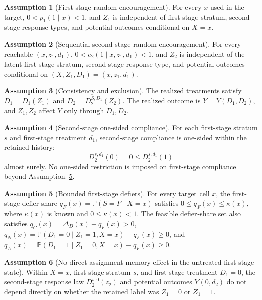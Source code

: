 \documentclass[11pt]{article}
\renewcommand{\Pr}{\mathbb{P}}
\theoremstyle{definition}
\newtheorem{assumption}{Assumption}
\theoremstyle{plain}
\theoremstyle{remark}
\begin{document}
\begin{assumption}[First-stage random encouragement]\label{ass:first-rand}
For every \(x\) used in the target, \(0<p_1(1\mid x)<1\), and \(Z_1\) is independent of first-stage stratum, second-stage response types, and potential outcomes conditional on \(X=x\).
\end{assumption}

\begin{assumption}[Sequential second-stage random encouragement]\label{ass:second-rand}
For every reachable \((x,z_1,d_1)\), \(0<e_2(1\mid x,z_1,d_1)<1\), and \(Z_2\) is independent of the latent first-stage stratum, second-stage response type, and potential outcomes conditional on \((X,Z_1,D_1)=(x,z_1,d_1)\).
\end{assumption}

\begin{assumption}[Consistency and exclusion]\label{ass:consistency}
The realized treatments satisfy \(D_1=D_1(Z_1)\) and \(D_2=D_2^{S,D_1}(Z_2)\).  The realized outcome is \(Y=Y(D_1,D_2)\), and \(Z_1,Z_2\) affect \(Y\) only through \(D_1,D_2\).
\end{assumption}

\begin{assumption}[Second-stage one-sided compliance]\label{ass:stage2-one-sided}
For each first-stage stratum \(s\) and first-stage treatment \(d_1\), second-stage compliance is one-sided within the retained history:
\[
D_2^{s,d_1}(0)=0\le D_2^{s,d_1}(1)
\]
almost surely.  No one-sided restriction is imposed on first-stage compliance beyond Assumption~\ref{ass:bounded-defiers}.
\end{assumption}

\begin{assumption}[Bounded first-stage defiers]\label{ass:bounded-defiers}
For every target cell \(x\), the first-stage defier share \(q_F(x)=\Pr(S=F\mid X=x)\) satisfies \(0\le q_F(x)\le\kappa(x)\), where \(\kappa(x)\) is known and \(0\le\kappa(x)<1\).  The feasible defier-share set also satisfies \(q_C(x)=\Delta_D(x)+q_F(x)>0\), \(q_N(x)=\Pr(D_1=0\mid Z_1=1,X=x)-q_F(x)\ge0\), and \(q_A(x)=\Pr(D_1=1\mid Z_1=0,X=x)-q_F(x)\ge0\).
\end{assumption}

\begin{assumption}[No direct assignment-memory effect in the untreated first-stage state]\label{ass:no-memory-direct}
Within \(X=x\), first-stage stratum \(s\), and first-stage treatment \(D_1=0\), the second-stage response law \(D_2^{s,0}(z_2)\) and potential outcomes \(Y(0,d_2)\) do not depend directly on whether the retained label was \(Z_1=0\) or \(Z_1=1\).
\end{assumption}
\end{document}
